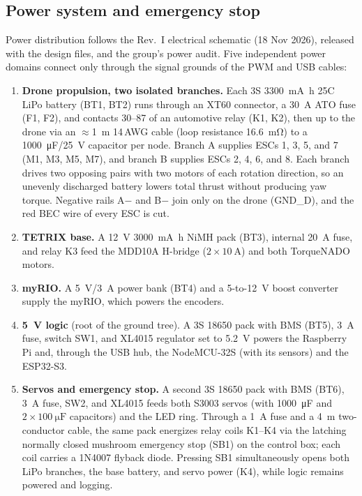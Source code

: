 \subsection{Power system and emergency stop}
\label{sec:power}
Power distribution follows the Rev.~I electrical schematic (18 Nov 2026), released with the design files, and the group's power audit. Five independent power domains connect only through the signal grounds of the PWM and USB cables:
\begin{enumerate}[label=\textbf{S\arabic*.}]
  \item \textbf{Drone propulsion, two isolated branches.} Each 3S \SI{3300}{\milli\ampere\hour} 25C LiPo battery (BT1, BT2) runs through an XT60 connector, a \SI{30}{\ampere} ATO fuse (F1, F2), and contacts 30--87 of an automotive relay (K1, K2), then up to the drone via an $\approx$\SI{1}{\metre} 14\,AWG cable (loop resistance \SI{16.6}{\milli\ohm}) to a \SI{1000}{\micro\farad}/\SI{25}{\volt} capacitor per node. Branch A supplies ESCs 1, 3, 5, and 7 (M1, M3, M5, M7), and branch B supplies ESCs 2, 4, 6, and 8. Each branch drives two opposing pairs with two motors of each rotation direction, so an unevenly discharged battery lowers total thrust without producing yaw torque. Negative rails A$-$ and B$-$ join only on the drone (GND\_D), and the red BEC wire of every ESC is cut.
  \item \textbf{TETRIX base.} A \SI{12}{\volt} \SI{3000}{\milli\ampere\hour} NiMH pack (BT3), internal \SI{20}{\ampere} fuse, and relay K3 feed the MDD10A H-bridge ($2\times\SI{10}{\ampere}$) and both TorqueNADO motors.
  \item \textbf{myRIO.} A \SI{5}{\volt}/\SI{3}{\ampere} power bank (BT4) and a 5-to-\SI{12}{\volt} boost converter supply the myRIO, which powers the encoders.
  \item \textbf{\SI{5}{\volt} logic} (root of the ground tree). A 3S 18650 pack with BMS (BT5), \SI{3}{\ampere} fuse, switch SW1, and XL4015 regulator set to \SI{5.2}{\volt} powers the Raspberry Pi and, through the USB hub, the NodeMCU-32S (with its sensors) and the ESP32-S3.
  \item \textbf{Servos and emergency stop.} A second 3S 18650 pack with BMS (BT6), \SI{3}{\ampere} fuse, SW2, and XL4015 feeds both S3003 servos (with \SI{1000}{\micro\farad} and $2\times\SI{100}{\micro\farad}$ capacitors) and the LED ring. Through a \SI{1}{\ampere} fuse and a \SI{4}{\metre} two-conductor cable, the same pack energizes relay coils K1--K4 via the latching normally closed mushroom emergency stop (SB1) on the control box; each coil carries a 1N4007 flyback diode. Pressing SB1 simultaneously opens both LiPo branches, the base battery, and servo power (K4), while logic remains powered and logging.
\end{enumerate}
